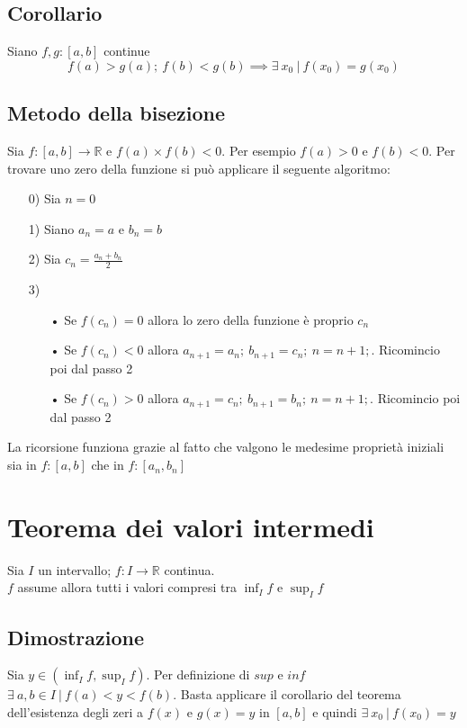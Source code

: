 \subsection{Corollario}
Siano $f,g: [a,b]$ continue
\begin{equation}
f(a) > g(a);\ f(b) < g(b) \implies \exists\ x_0\ |\ f(x_0) = g(x_0)
\end{equation}
\subsection{Metodo della bisezione}
Sia $f: [a,b] \to \mathbb{R}$ e $f(a) \times f(b) < 0$. Per esempio $f(a) > 0$ e $f(b) < 0$. Per trovare uno zero della funzione si può applicare il seguente algoritmo:
\begin{enumerate}
\item[0)] Sia $n = 0$
\item[1)] Siano $a_n = a$ e $b_n = b$
\item[2)] Sia $c_n = \frac{a_n + b_n}{2}$
\item[3)] \begin{enumerate}
	\item[•] Se $f(c_n) = 0$ allora lo zero della funzione è proprio $c_n$
	\item[•] Se $f(c_n) < 0$ allora $a_{n+1} = a_n;\ b_{n+1} = c_n;\ n = n + 1;$. Ricomincio poi dal passo 2
	\item[•] Se $f(c_n) > 0$ allora $a_{n+1} = c_n;\ b_{n+1} = b_n;\ n = n + 1;$. Ricomincio poi dal passo 2 
\end{enumerate}
\end{enumerate}
La ricorsione funziona grazie al fatto che valgono le medesime proprietà iniziali sia in $f: [a,b]$ che in $f: [a_n,b_n]$

\section{Teorema dei valori intermedi}
Sia $I$ un intervallo; $f: I \to \mathbb{R}$ continua.\\
$f$ assume allora tutti i valori compresi tra $\displaystyle \inf_I f \text{ e } \sup_I f$
\subsection{Dimostrazione}
Sia $y \in \displaystyle (\inf_I f, \sup_I f)$. Per definizione di $sup$ e $inf$ $\exists \ a,b \in I\ |\ f(a) < y < f(b)$. Basta applicare il corollario del teorema dell'esistenza degli zeri a $f(x)$ e $g(x) = y$ in $[a,b]$ e quindi $\exists \ x_0\ |\ f(x_0) = y$

